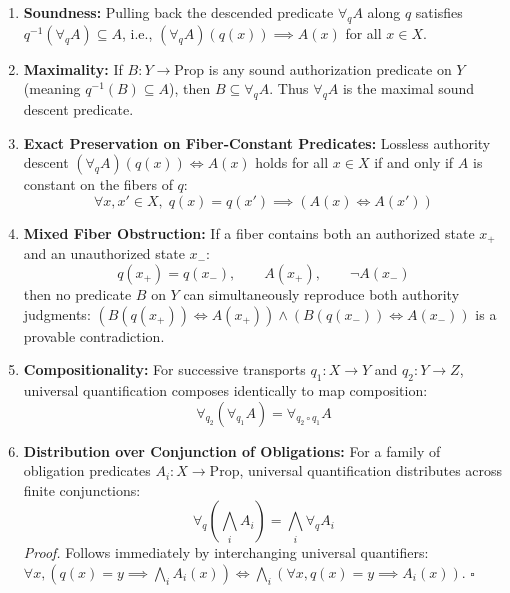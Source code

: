 \documentclass[
  10pt,
]{article}
\begin{document}
\begin{enumerate}
\def\labelenumi{\arabic{enumi}.}
\item
  \textbf{Soundness:} Pulling back the descended predicate \hypertarget{math-E0064-0096}{}{\(\forall_q A\)} along \hypertarget{math-E0078-0097}{}{\(q\)} satisfies \hypertarget{math-E0079-0098}{}{\(q^{-1}(\forall_q A) \subseteq A\)}, i.e., \hypertarget{math-E0080-0099}{}{\((\forall_q A)(q(x)) \implies A(x)\)} for all \hypertarget{math-E0081-0100}{}{\(x \in X\)}.
\item
  \textbf{Maximality:} If \hypertarget{math-E0082-0101}{}{\(B : Y \to \mathrm{Prop}\)} is any sound authorization predicate on \hypertarget{math-E0083-0102}{}{\(Y\)} (meaning \hypertarget{math-E0067-0103}{}{\(q^{-1}(B) \subseteq A\)}), then \hypertarget{math-E0073-0104}{}{\(B \subseteq \forall_q A\)}. Thus \hypertarget{math-E0064-0105}{}{\(\forall_q A\)} is the maximal sound descent predicate.
\item
  \textbf{Exact Preservation on Fiber-Constant Predicates:} Lossless authority descent \hypertarget{math-E0084-0106}{}{\((\forall_q A)(q(x)) \iff A(x)\)} holds for all \hypertarget{math-E0081-0107}{}{\(x \in X\)} if and only if \hypertarget{math-E0038-0108}{}{\(A\)} is constant on the fibers of \hypertarget{math-E0078-0109}{}{\(q\)}: \hypertarget{math-E0085-0110}{}{\[\forall x, x' \in X,\; q(x) = q(x') \implies (A(x) \iff A(x'))\]}
\item
  \textbf{Mixed Fiber Obstruction:} If a fiber contains both an authorized state \hypertarget{math-E0086-0111}{}{\(x_+\)} and an unauthorized state \hypertarget{math-E0087-0112}{}{\(x_-\)}: \hypertarget{math-E0088-0113}{}{\[q(x_+) = q(x_-), \qquad A(x_+), \qquad \neg A(x_-)\]} then no predicate \hypertarget{math-E0039-0114}{}{\(B\)} on \hypertarget{math-E0083-0115}{}{\(Y\)} can simultaneously reproduce both authority judgments: \hypertarget{math-E0089-0116}{}{\((B(q(x_+)) \iff A(x_+)) \wedge (B(q(x_-)) \iff A(x_-))\)} is a provable contradiction.
\item
  \textbf{Compositionality:} For successive transports \hypertarget{math-E0090-0117}{}{\(q_1 : X \to Y\)} and \hypertarget{math-E0091-0118}{}{\(q_2 : Y \to Z\)}, universal quantification composes identically to map composition: \hypertarget{math-E0092-0119}{}{\[\forall_{q_2}(\forall_{q_1} A) = \forall_{q_2 \circ q_1} A\]}
\item
  \textbf{Distribution over Conjunction of Obligations:} For a family of obligation predicates \hypertarget{math-E0093-0120}{}{\(A_i : X \to \mathrm{Prop}\)}, universal quantification distributes across finite conjunctions: \hypertarget{math-E0094-0121}{}{\[\boxed{ \forall_q \left(\bigwedge_i A_i\right) = \bigwedge_i \forall_q A_i }\]} \emph{Proof.} Follows immediately by interchanging universal quantifiers: \hypertarget{math-E0095-0122}{}{\(\forall x, (q(x) = y \implies \bigwedge_i A_i(x)) \iff \bigwedge_i (\forall x, q(x) = y \implies A_i(x))\)}. \hypertarget{math-E0036-0123}{}{\(\square\)}
\end{enumerate}
\end{document}
